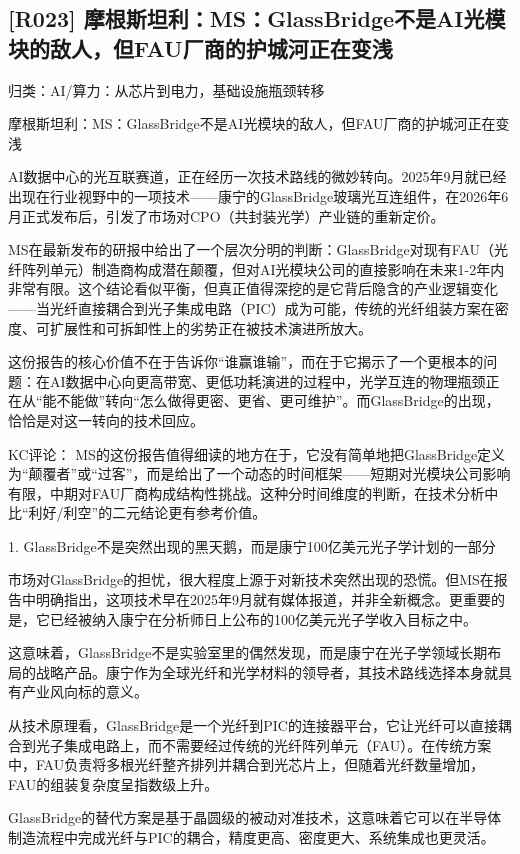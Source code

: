 \documentclass[11pt]{ctexart}
\begin{document}
\subsection{[R023] 摩根斯坦利：MS：GlassBridge不是AI光模块的敌人，但FAU厂商的护城河正在变浅}
{\small\color{refgray}归类：AI/算力：从芯片到电力，基础设施瓶颈转移}

摩根斯坦利：MS：GlassBridge不是AI光模块的敌人，但FAU厂商的护城河正在变浅

AI数据中心的光互联赛道，正在经历一次技术路线的微妙转向。2025年9月就已经出现在行业视野中的一项技术——康宁的GlassBridge玻璃光互连组件，在2026年6月正式发布后，引发了市场对CPO（共封装光学）产业链的重新定价。

MS在最新发布的研报中给出了一个层次分明的判断：GlassBridge对现有FAU（光纤阵列单元）制造商构成潜在颠覆，但对AI光模块公司的直接影响在未来1-2年内非常有限。这个结论看似平衡，但真正值得深挖的是它背后隐含的产业逻辑变化——当光纤直接耦合到光子集成电路（PIC）成为可能，传统的光纤组装方案在密度、可扩展性和可拆卸性上的劣势正在被技术演进所放大。

这份报告的核心价值不在于告诉你“谁赢谁输”，而在于它揭示了一个更根本的问题：在AI数据中心向更高带宽、更低功耗演进的过程中，光学互连的物理瓶颈正在从“能不能做”转向“怎么做得更密、更省、更可维护”。而GlassBridge的出现，恰恰是对这一转向的技术回应。

KC评论： MS的这份报告值得细读的地方在于，它没有简单地把GlassBridge定义为“颠覆者”或“过客”，而是给出了一个动态的时间框架——短期对光模块公司影响有限，中期对FAU厂商构成结构性挑战。这种分时间维度的判断，在技术分析中比“利好/利空”的二元结论更有参考价值。

1. GlassBridge不是突然出现的黑天鹅，而是康宁100亿美元光子学计划的一部分

市场对GlassBridge的担忧，很大程度上源于对新技术突然出现的恐慌。但MS在报告中明确指出，这项技术早在2025年9月就有媒体报道，并非全新概念。更重要的是，它已经被纳入康宁在分析师日上公布的100亿美元光子学收入目标之中。

这意味着，GlassBridge不是实验室里的偶然发现，而是康宁在光子学领域长期布局的战略产品。康宁作为全球光纤和光学材料的领导者，其技术路线选择本身就具有产业风向标的意义。

从技术原理看，GlassBridge是一个光纤到PIC的连接器平台，它让光纤可以直接耦合到光子集成电路上，而不需要经过传统的光纤阵列单元（FAU）。在传统方案中，FAU负责将多根光纤整齐排列并耦合到光芯片上，但随着光纤数量增加，FAU的组装复杂度呈指数级上升。

GlassBridge的替代方案是基于晶圆级的被动对准技术，这意味着它可以在半导体制造流程中完成光纤与PIC的耦合，精度更高、密度更大、系统集成也更灵活。
\end{document}
